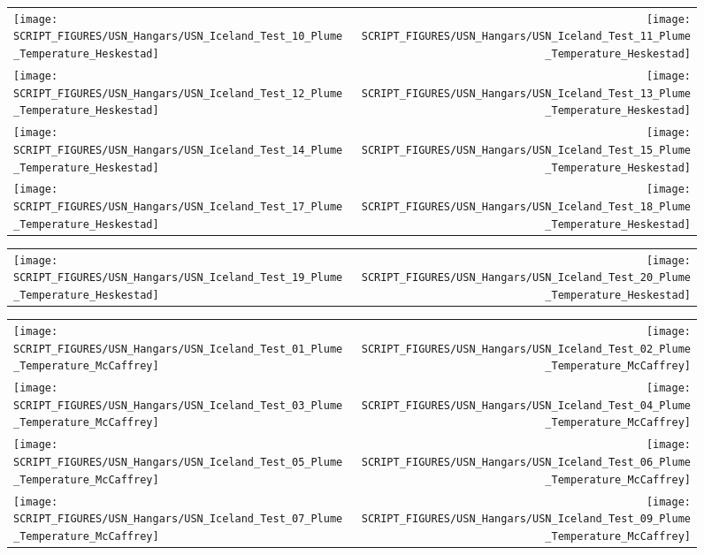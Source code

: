 \begin{figure}[p]
\begin{tabular*}{\textwidth}{l@{\extracolsep{\fill}}r}
\texttt{[image: SCRIPT\_FIGURES/USN\_Hangars/USN\_Iceland\_Test\_10\_Plume\_Temperature\_Heskestad]} &
\texttt{[image: SCRIPT\_FIGURES/USN\_Hangars/USN\_Iceland\_Test\_11\_Plume\_Temperature\_Heskestad]} \\
\texttt{[image: SCRIPT\_FIGURES/USN\_Hangars/USN\_Iceland\_Test\_12\_Plume\_Temperature\_Heskestad]} &
\texttt{[image: SCRIPT\_FIGURES/USN\_Hangars/USN\_Iceland\_Test\_13\_Plume\_Temperature\_Heskestad]} \\
\texttt{[image: SCRIPT\_FIGURES/USN\_Hangars/USN\_Iceland\_Test\_14\_Plume\_Temperature\_Heskestad]} &
\texttt{[image: SCRIPT\_FIGURES/USN\_Hangars/USN\_Iceland\_Test\_15\_Plume\_Temperature\_Heskestad]} \\
\texttt{[image: SCRIPT\_FIGURES/USN\_Hangars/USN\_Iceland\_Test\_17\_Plume\_Temperature\_Heskestad]} &
\texttt{[image: SCRIPT\_FIGURES/USN\_Hangars/USN\_Iceland\_Test\_18\_Plume\_Temperature\_Heskestad]}
\end{tabular*}
\end{figure}

\begin{figure}[p]
\begin{tabular*}{\textwidth}{l@{\extracolsep{\fill}}r}
\texttt{[image: SCRIPT\_FIGURES/USN\_Hangars/USN\_Iceland\_Test\_19\_Plume\_Temperature\_Heskestad]} &
\texttt{[image: SCRIPT\_FIGURES/USN\_Hangars/USN\_Iceland\_Test\_20\_Plume\_Temperature\_Heskestad]}
\end{tabular*}
\end{figure}

\begin{figure}[p]
\begin{tabular*}{\textwidth}{l@{\extracolsep{\fill}}r}
\texttt{[image: SCRIPT\_FIGURES/USN\_Hangars/USN\_Iceland\_Test\_01\_Plume\_Temperature\_McCaffrey]} &
\texttt{[image: SCRIPT\_FIGURES/USN\_Hangars/USN\_Iceland\_Test\_02\_Plume\_Temperature\_McCaffrey]} \\
\texttt{[image: SCRIPT\_FIGURES/USN\_Hangars/USN\_Iceland\_Test\_03\_Plume\_Temperature\_McCaffrey]} &
\texttt{[image: SCRIPT\_FIGURES/USN\_Hangars/USN\_Iceland\_Test\_04\_Plume\_Temperature\_McCaffrey]} \\
\texttt{[image: SCRIPT\_FIGURES/USN\_Hangars/USN\_Iceland\_Test\_05\_Plume\_Temperature\_McCaffrey]} &
\texttt{[image: SCRIPT\_FIGURES/USN\_Hangars/USN\_Iceland\_Test\_06\_Plume\_Temperature\_McCaffrey]} \\
\texttt{[image: SCRIPT\_FIGURES/USN\_Hangars/USN\_Iceland\_Test\_07\_Plume\_Temperature\_McCaffrey]} &
\texttt{[image: SCRIPT\_FIGURES/USN\_Hangars/USN\_Iceland\_Test\_09\_Plume\_Temperature\_McCaffrey]}
\end{tabular*}
\end{figure}

